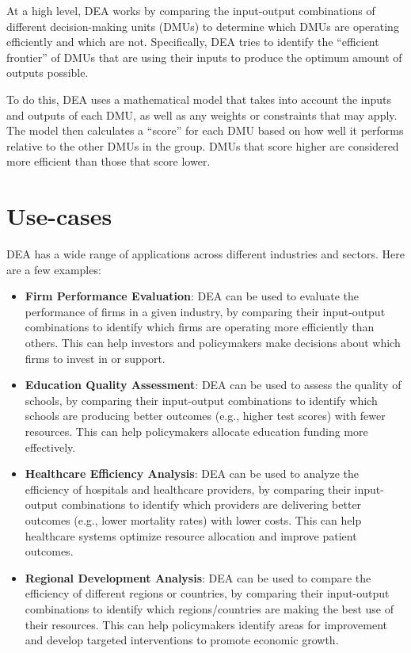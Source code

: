 \documentclass[
]{book}
\begin{document}
At a high level, DEA works by comparing the input-output combinations of different decision-making units (DMUs) to determine which DMUs are operating efficiently and which are not. Specifically, DEA tries to identify the ``efficient frontier'' of DMUs that are using their inputs to produce the optimum amount of outputs possible.

To do this, DEA uses a mathematical model that takes into account the inputs and outputs of each DMU, as well as any weights or constraints that may apply. The model then calculates a ``score'' for each DMU based on how well it performs relative to the other DMUs in the group. DMUs that score higher are considered more efficient than those that score lower.

\hypertarget{use-cases}{%
\section{Use-cases}\label{use-cases}}

DEA has a wide range of applications across different industries and sectors. Here are a few examples:

\begin{itemize}
\item
  \textbf{Firm Performance Evaluation}: DEA can be used to evaluate the performance of firms in a given industry, by comparing their input-output combinations to identify which firms are operating more efficiently than others. This can help investors and policymakers make decisions about which firms to invest in or support.
\item
  \textbf{Education Quality Assessment}: DEA can be used to assess the quality of schools, by comparing their input-output combinations to identify which schools are producing better outcomes (e.g., higher test scores) with fewer resources. This can help policymakers allocate education funding more effectively.
\item
  \textbf{Healthcare Efficiency Analysis}: DEA can be used to analyze the efficiency of hospitals and healthcare providers, by comparing their input-output combinations to identify which providers are delivering better outcomes (e.g., lower mortality rates) with lower costs. This can help healthcare systems optimize resource allocation and improve patient outcomes.
\item
  \textbf{Regional Development Analysis}: DEA can be used to compare the efficiency of different regions or countries, by comparing their input-output combinations to identify which regions/countries are making the best use of their resources. This can help policymakers identify areas for improvement and develop targeted interventions to promote economic growth.
\end{itemize}
\end{document}
